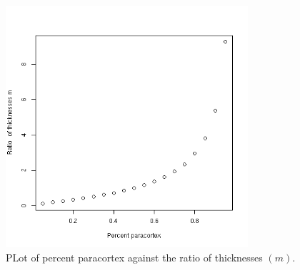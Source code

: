 %

\begin{figure}[!h]
  \centering
  \includegraphics[width=0.8\textwidth]{ptom.png}
  \caption{PLot of percent paracortex against the ratio of thicknesses $(m)$.}
  \label{fig:ptom}
\end{figure}

%

